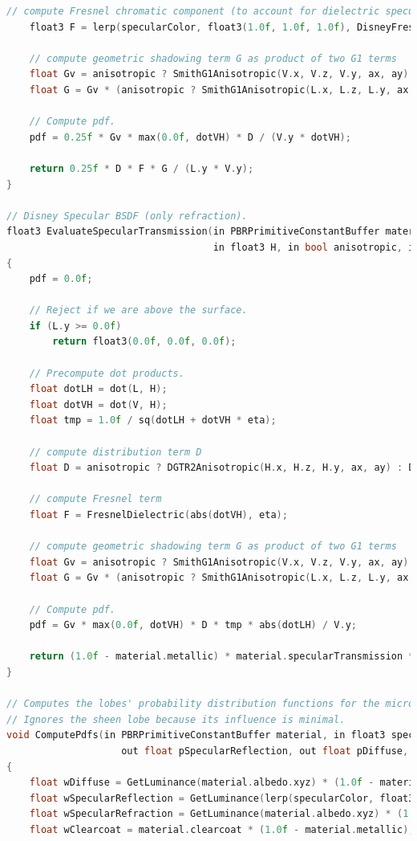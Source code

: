 \documentclass[12pt,a4paper]{report}
\numberwithin{equation}{section} %
\begin{document}
\begin{appendices}
\begin{lstlisting}[caption={Evaluarea și eșantionarea BSDF-ului Disney},label={lst:bsdf},language=C++,escapechar=\$]
	// compute Fresnel chromatic component (to account for dielectric specular reflection)
	float3 F = lerp(specularColor, float3(1.0f, 1.0f, 1.0f), DisneyFresnelMix(dotLH, eta, material.metallic));

	// compute geometric shadowing term G as product of two G1 terms
	float Gv = anisotropic ? SmithG1Anisotropic(V.x, V.z, V.y, ax, ay) : SmithG1(V.y, material.roughness);
	float G = Gv * (anisotropic ? SmithG1Anisotropic(L.x, L.z, L.y, ax, ay) : SmithG1(L.y, material.roughness));

	// Compute pdf.
	pdf = 0.25f * Gv * max(0.0f, dotVH) * D / (V.y * dotVH);

	return 0.25f * D * F * G / (L.y * V.y);
}

// Disney Specular BSDF (only refraction).
float3 EvaluateSpecularTransmission(in PBRPrimitiveConstantBuffer material, in float eta, in float3 V, in float3 L,
									in float3 H, in bool anisotropic, in float ax, in float ay, out float pdf)
{
	pdf = 0.0f;

	// Reject if we are above the surface.
	if (L.y >= 0.0f)
		return float3(0.0f, 0.0f, 0.0f);

	// Precompute dot products.
	float dotLH = dot(L, H);
	float dotVH = dot(V, H);
	float tmp = 1.0f / sq(dotLH + dotVH * eta);

	// compute distribution term D
	float D = anisotropic ? DGTR2Anisotropic(H.x, H.z, H.y, ax, ay) : DGTR2(H.y, material.roughness);

	// compute Fresnel term
	float F = FresnelDielectric(abs(dotVH), eta);

	// compute geometric shadowing term G as product of two G1 terms
	float Gv = anisotropic ? SmithG1Anisotropic(V.x, V.z, V.y, ax, ay) : SmithG1(V.y, material.roughness);
	float G = Gv * (anisotropic ? SmithG1Anisotropic(L.x, L.z, L.y, ax, ay) : SmithG1(L.y, material.roughness));

	// Compute pdf.
	pdf = Gv * max(0.0f, dotVH) * D * tmp * abs(dotLH) / V.y;

	return (1.0f - material.metallic) * material.specularTransmission * sqrt(material.albedo.xyz) * (1.0f - F) * D * G * abs(dotLH) * abs(dotVH) * sq(eta) * tmp / (abs(L.y) * abs(V.y));
}

// Computes the lobes' probability distribution functions for the microfacet model.
// Ignores the sheen lobe because its influence is minimal.
void ComputePdfs(in PBRPrimitiveConstantBuffer material, in float3 specularColor, in float fresnelMix,
					out float pSpecularReflection, out float pDiffuse, out float pClearcoat, out float pSpecularRefraction)
{
	float wDiffuse = GetLuminance(material.albedo.xyz) * (1.0f - material.metallic) * (1.0f - material.specularTransmission);
	float wSpecularReflection = GetLuminance(lerp(specularColor, float3(1, 1, 1), fresnelMix));
	float wSpecularRefraction = GetLuminance(material.albedo.xyz) * (1.0f - fresnelMix) * material.specularTransmission * (1.0f - material.metallic);
	float wClearcoat = material.clearcoat * (1.0f - material.metallic);


\end{lstlisting}
\end{appendices}
\end{document}
